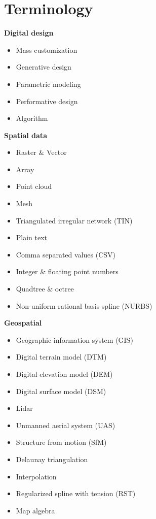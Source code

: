 \documentclass[11pt,article,oneside]{memoir}
\begin{document}
\section{Terminology}
\begin{multicols}{2}
\raggedright
\small
%
\textbf{Digital design}
\begin{itemize}
\item Mass customization
\item Generative design
\item Parametric modeling
\item Performative design
\item Algorithm
\end{itemize}

\textbf{Spatial data}
\begin{itemize}
\item Raster \& Vector
\item Array
\item Point cloud
\item Mesh
\item Triangulated irregular network (TIN)
\item Plain text
\item Comma separated values (CSV)
\item Integer \& floating point numbers
\item Quadtree \& octree
\item Non-uniform rational basis spline (NURBS)
\end{itemize}

\textbf{Geospatial}
\begin{itemize}
\item Geographic information system (GIS)
\item Digital terrain model (DTM)
\item Digital elevation model (DEM)
\item Digital surface model (DSM)
\item Lidar
\item Unmanned aerial system (UAS)
\item Structure from motion (SfM)
\item Delaunay triangulation
\item Interpolation
\item Regularized spline with tension (RST)
\item Map algebra
\end{itemize}


\end{multicols}
\end{document}
